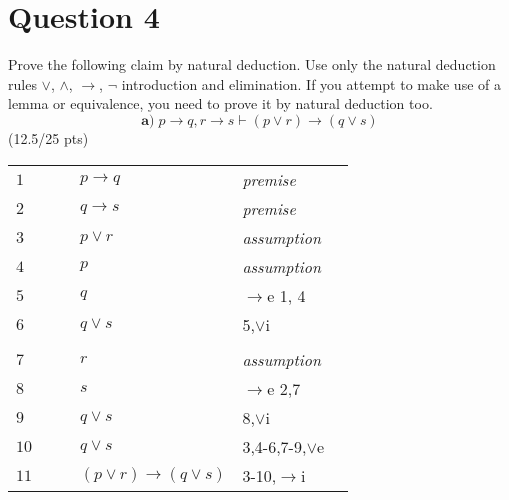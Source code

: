 \documentclass[a4paper,12pt]{article}
\newcommand\tab[1][1cm]{\hspace*{#1}}
\begin{document}
\section*{Question 4 \hfill {}}
\tab Prove the following claim by natural deduction. Use only the natural deduction rules $\vee$, $\wedge$, $\rightarrow$, $\neg$ introduction and elimination. If you attempt to make use of a lemma or equivalence, you need to prove it by natural deduction too.
\begin{equation*}
    \textbf{a)} \; p \rightarrow q, r \rightarrow s \vdash (p \vee r) \rightarrow (q \vee s)
\end{equation*}
\hfill \small{(12.5/25 pts)}\\
\begin{tcolorbox}
\begin{table}[H]
    \centering
	\begin{tabular}{*6{l}}
	
	$1$ & & & $p \rightarrow q$ & \textit{premise} & \\ 
	
	$2$ & & & $q \rightarrow s$ &\textit{premise} & \\ \cline{1-6}
	
	$3$ & & & $p \vee r$ &\textit{assumption}& \\ \cline{2-5}
	
	$4$ & & & $p$ &\textit{assumption} & \\
	
	$5$ & & & $q$ &$\rightarrow$e 1, 4 & \\ 
	
	$6$ & & & $q \vee s$ & 5,$\vee$i  & \\ \cline{2-5} \\ \cline{3-5} \cline{3-5}
	
	$7$ & & & $r$ & \textit{assumption} & \\ 
	
	$8$ & & & $s$ & $\rightarrow$e 2,7 & \\
	
	$9$ & & & $q \vee s$ & 8,$\vee$i & \\ \cline{3-5} \cline{3-5}
	
	$10$ & & & $q \vee s$ & 3,4-6,7-9,$\vee$e &\\ \cline{1-6}
	
	$11$ & & & $(p \vee r) \rightarrow (q \vee s)$ & 3-10,$\rightarrow$i &\\
	

\end{tabular}
\end{table}
\end{tcolorbox}
\end{document}

